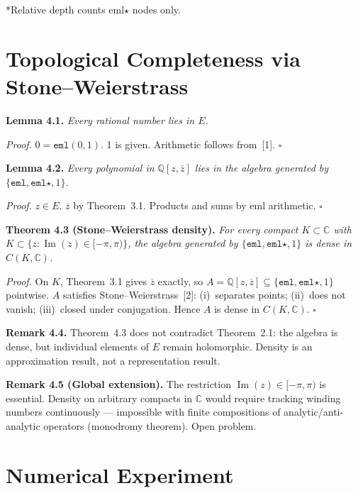 \documentclass[11pt,a4paper]{article}
\begin{document}
*Relative depth counts eml$\star$ nodes only.

\section{Topological Completeness via Stone--Weierstrass}

\textbf{Lemma 4.1.} \textit{Every rational number lies in $E$.}

\textit{Proof.} $0 = \texttt{eml}(0, 1)$. 1 is given. Arithmetic follows from~[1]. $\square$

\textbf{Lemma 4.2.} \textit{Every polynomial in $\mathbb{Q}[z, \overline{z}]$ lies in the algebra generated by $\{\texttt{eml}, \texttt{eml}\star, 1\}$.}

\textit{Proof.} $z \in E$. $\overline{z}$ by Theorem~3.1. Products and sums by eml arithmetic. $\square$

\textbf{Theorem 4.3 (Stone--Weierstrass density).} \textit{For every compact $K \subset \mathbb{C}$ with $K \subset \{z : \operatorname{Im}(z) \in [-\pi, \pi)\}$, the algebra generated by $\{\texttt{eml}, \texttt{eml}\star, 1\}$ is dense in $C(K, \mathbb{C})$.}

\textit{Proof.} On $K$, Theorem~3.1 gives $\overline{z}$ exactly, so $A = \mathbb{Q}[z, \overline{z}] \subseteq \{\texttt{eml}, \texttt{eml}\star, 1\}$ pointwise. $A$ satisfies Stone--Weierstrass~[2]: (i)~separates points; (ii)~does not vanish; (iii)~closed under conjugation. Hence $A$ is dense in $C(K, \mathbb{C})$. $\square$

\textbf{Remark 4.4.} Theorem~4.3 does not contradict Theorem~2.1: the algebra is dense, but individual elements of $E$ remain holomorphic. Density is an approximation result, not a representation result.

\textbf{Remark 4.5 (Global extension).} The restriction $\operatorname{Im}(z) \in [-\pi, \pi)$ is essential. Density on arbitrary compacts in $\mathbb{C}$ would require tracking winding numbers continuously --- impossible with finite compositions of analytic/anti-analytic operators (monodromy theorem). Open problem.

\section{Numerical Experiment}
\end{document}
